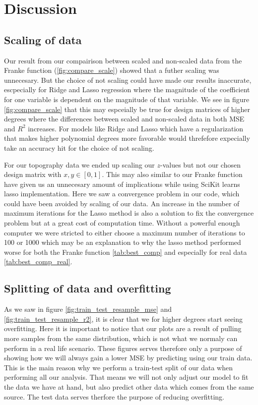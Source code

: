 \documentclass[12pt]{article}
\begin{document}
\section{Discussion}
\subsection{Scaling of data}
Our result from our compairison between scaled and non-scaled data from the Franke function (\ref{fig:compare_scale}) showed that a futher scaling was unnecesary. But the choice of not scaling could have made our results inaccurate, escpecially for Ridge and Lasso regression where the magnitude of the coefficient for one variable is dependent on the magnitude of that variable. We see in figure \ref{fig:compare_scale} that this may espceially be true for design matrices of higher degrees where the differences between scaled and non-scaled data in both MSE and $R^2$ increases. For models like Ridge and Lasso which have a regularization that makes higher polynomial degrees more favorable would threfefore expecially take an accuracy hit for the choice of not scaling.

For our topography data we ended up scaling our $z$-values but not our chosen design matrix with $x,y\in [0,1]$. This may also similar to our Franke function have given us an unnecesary amount of implications while using SciKit learns lasso implementation. Here we saw a convergence problem in our code, which could have been avoided by scaling of our data. An increase in the number of maximum iterations for the Lasso method is also a solution to fix the convergence problem but at a great cost of computation time. Without a powerful enough computer we were stricted to either choose a maximum number of iterations to 100 or 1000 which may be an explanation to why the lasso method performed worse for both the Franke function \ref{tab:best_comp} and especially for real data \ref{tab:best_comp_real}.

\subsection{Splitting of data and overfitting}
As we saw in figure \ref{fig:train_test_resample_mse} and \ref{fig:train_test_resample_r2}, it is clear that we for higher degrees start seeing overfitting. Here it is important to notice that our plots are a result of pulling more samples from the same distribution, which is not what we normaly can perform in a real life scenario. These figures serves therefore only a purpose of showing how we will always gain a lower MSE by predicting using our train data. This is the main reason why we perform a train-test split of our data when performing all our analysis. That means we will not only adjust our model to fit the data we have at hand, but also predict other data which comes from the same source. The test data serves therfore the purpose of reducing overfitting.
\end{document}
